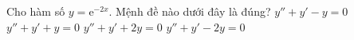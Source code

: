 \begin{ex}%
	Cho hàm số $y=\mathrm{e}^{-2x}$. Mệnh đề nào dưới đây là đúng?  
	\choice
	{$y''+y'-y=0$ }
	{$y''+y'+y=0$}
	{$y''+y'+2y=0$}
	{\True $y''+y'-2y=0$}
\end{ex}
